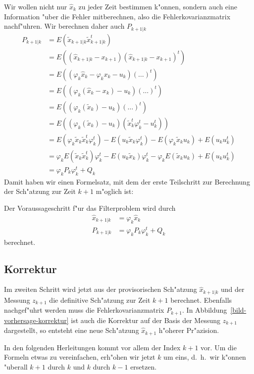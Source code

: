 Wir wollen nicht nur $\hat x_k$ zu jeder Zeit bestimmen k"onnen, sondern
auch eine Information "uber die Fehler mitberechnen, also die Fehlerkovarianzmatrix
nachf"uhren. Wir berechnen daher auch $P_{k+1|k}$
\begin{align*}
P_{k+1|k}&=E(\tilde x_{k+1|k}\tilde x_{k+1|k}^t)\\
&=E( (\hat x_{k+1|k}-x_{k+1} ) (\hat x_{k+1|k}-x_{k+1} )^t)\\
&=E(
(\varphi_k\hat x_k-\varphi_kx_k-u_k)
(\dots)^t
)\\
&=E(
(\varphi_k(\hat x_k-x_k)-u_k)
(\dots)^t
)\\
&=E(
(\varphi_k(\tilde x_k)-u_k)
(\dots)^t
)\\
&=E(
(\varphi_k(\tilde x_k)-u_k)
(\tilde x_k^t\varphi_k^t-u_k^t)
)\\
&=E(\varphi_k\tilde x_k \tilde x_k^t\varphi_k^t)-E(u_k\tilde x_k\varphi_k^t)-E(\varphi_k\tilde x_ku_k)+E(u_ku_k^t)\\
&=\varphi_k E(\tilde x_k \tilde x_k^t)\varphi_k^t-E(u_k\tilde x_k)\varphi_k^t-\varphi_k E(\tilde x_ku_k)+E(u_ku_k^t)\\
&=\varphi_kP_k\varphi_k^t+Q_k
\end{align*}
Damit haben wir einen Formelsatz, mit dem der erste Teilschritt zur Berechnung
der Sch"atzung zur Zeit $k+1$ m"oglich ist:
\begin{definition}Der Voraussageschritt f"ur das Filterproblem wird durch
\begin{align}
\hat x_{k+1|k}&=\varphi_k\hat x_k \label{estimate-prediction}\\
P_{k+1|k}&=\varphi_kP_k\varphi_k^t + Q_k \label{covariance-prediction}
\end{align}
berechnet.
\end{definition}

\subsection{Korrektur}
Im zweiten Schritt wird jetzt aus der provisorischen Sch"atzung $\hat x_{k+1|k}$
und der Messung $z_{k+1}$ die definitive Sch"atzung zur Zeit $k+1$ berechnet.
Ebenfalls nachgef"uhrt werden muss die Fehlerkovarianzmatrix $P_{k+1}$.
In Abbildung~\ref{bild-vorhersage-korrektur} ist auch die Korrektur auf der Basis
der Messung $z_{k+1}$ dargestellt, so entsteht eine neue Sch"atzung
$\hat x_{k+1}$ h"oherer Pr"azision.

In den folgenden Herleitungen kommt vor allem der Index $k+1$ vor. Um die Formeln
etwas zu vereinfachen, erh"ohen wir jetzt $k$ um eins, d.~h.~wir k"onnen
"uberall $k+1$ durch $k$ und $k$ durch $k-1$ ersetzen.

